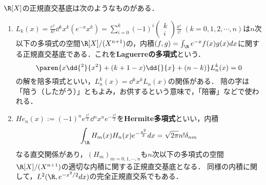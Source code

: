 \documentclass[uplatex, dvipdfmx]{jsreport}
\begin{document}
\begin{example}
    $\R[X]$の正規直交基底は次のようなものがある．
    \begin{enumerate}
        \item $L_k(x)=\frac{e^x}{k!}\dd{^k}{x^k}(e^{-x}x^k)=\sum_{i=0}^k(-1)^i \begin{pmatrix}k\\i\end{pmatrix}\frac{x^i}{i!}\;(k=0,1,2,\cdots,n)$は$n$次以下の多項式の空間$\R[X]/(X^{n+1})$の，内積$(f,g)=\int_{\R}e^{-x}f(x)g(x)dx$に関する正規直交基底である．これを\textbf{Laguerreの多項式}という．
        \[\paren{x\dd{^2}{x^2}+(k+1-x)\dd{}{x}+(n-k)}L_n^k(x)=0\]
        の解を陪多項式といい，$L^k_n(x)=\dd{^k}{x^k}L_n(x)$の関係がある．
        陪の字は「陪う（したがう）」ともよみ，お供するという意味で，「陪審」などで使われる．
        \item $He_n(x):=(-1)^ne^{\frac{x^2}{2}}\dd{^n}{x^n}e^{-\frac{x^2}{2}}$を\textbf{Hermite多項式}といい，内積
        \[\int_{\R}H_m(x)H_n(x)e^{-\frac{x^2}{2}}dx=\sqrt{2\pi}n!\delta_{nm}\]
        なる直交関係があり，$(H_m)_{m=0,1,\cdots,n}$も$n$次以下の多項式の空間$\R[X]/(X^{n+1})$の適切な内積に関する正規直交基底となる．
        同様の内積に関して，$L^2(\R,e^{-x^2/2}dx)$の完全正規直交系でもある．
    \end{enumerate}
\end{example}
\end{document}
